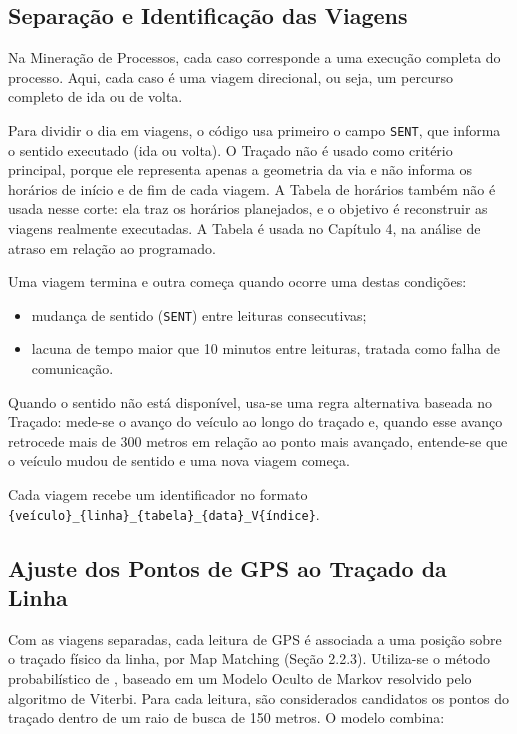 \subsection{Separação e Identificação das Viagens}\label{subsec:separacaoViagens}

Na Mineração de Processos, cada caso corresponde a uma execução completa do processo. Aqui, cada caso é uma viagem direcional, ou seja, um percurso completo de ida ou de volta.

Para dividir o dia em viagens, o código usa primeiro o campo \texttt{SENT}, que informa o sentido executado (ida ou volta). O Traçado não é usado como critério principal, porque ele representa apenas a geometria da via e não informa os horários de início e de fim de cada viagem. A Tabela de horários também não é usada nesse corte: ela traz os horários planejados, e o objetivo é reconstruir as viagens realmente executadas. A Tabela é usada no Capítulo 4, na análise de atraso em relação ao programado.

Uma viagem termina e outra começa quando ocorre uma destas condições:

\begin{itemize}
  \item mudança de sentido (\texttt{SENT}) entre leituras consecutivas;
  \item lacuna de tempo maior que 10 minutos entre leituras, tratada como falha de comunicação.
\end{itemize}

Quando o sentido não está disponível, usa-se uma regra alternativa baseada no Traçado: mede-se o avanço do veículo ao longo do traçado e, quando esse avanço retrocede mais de 300 metros em relação ao ponto mais avançado, entende-se que o veículo mudou de sentido e uma nova viagem começa.

Cada viagem recebe um identificador no formato \texttt{\{veículo\}\_\{linha\}\_\{tabela\}\_\{data\}\_V\{índice\}}.

\subsection{Ajuste dos Pontos de GPS ao Traçado da Linha}\label{subsec:mapmatchingMetodo}

Com as viagens separadas, cada leitura de GPS é associada a uma posição sobre o traçado físico da linha, por Map Matching (Seção 2.2.3). Utiliza-se o método probabilístico de , baseado em um Modelo Oculto de Markov resolvido pelo algoritmo de Viterbi. Para cada leitura, são considerados candidatos os pontos do traçado dentro de um raio de busca de 150 metros. O modelo combina:

